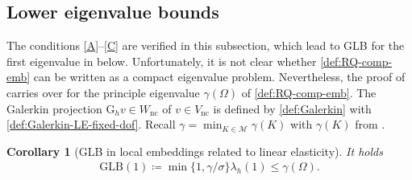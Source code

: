 \documentclass[a4paper]{amsart}
\numberwithin{equation}{section}
\newcommand{\Mcal}{\mathcal{M}}
\newtheorem{corollary}[theorem]{Corollary}
\theoremstyle{remark}
\theoremstyle{definition}
\theoremstyle{assumptionnoperiod}
\begin{document}
\subsection{Lower eigenvalue bounds}
The conditions \ref{A}--\ref{C} are verified in this subsection, which lead to GLB for the first eigenvalue in  below.
Unfortunately, it is not clear whether \eqref{def:RQ-comp-emb} can be written as a compact eigenvalue problem. Nevertheless, the proof of  carries over for the principle eigenvalue $\gamma(\Omega)$ of \eqref{def:RQ-comp-emb}.
The Galerkin projection $\mathrm{G}_h v \in W_\mathrm{nc}$ of $v \in V_\mathrm{nc}$ is defined by \eqref{def:Galerkin} with \eqref{def:Galerkin-LE-fixed-dof}.
Recall $\gamma = \min_{K \in \Mcal} \gamma(K)$ with $\gamma(K)$ from .
\begin{corollary}[GLB in local embeddings related to linear elasticity]\label{cor:comp-emb}
	It holds
	\begin{align*}
		\mathrm{GLB}(1) \coloneqq \min\{1,\gamma/\sigma\} \lambda_h(1) \leq \gamma(\Omega).
	\end{align*}
\end{corollary}
\end{document}
